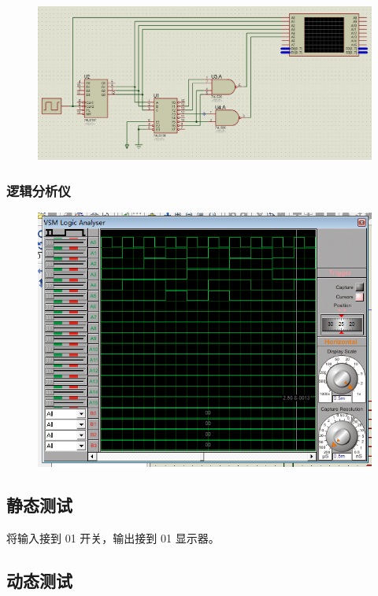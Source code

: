 \documentclass{article}
\begin{document}
\begin{figure}[!hbp]
  \centering
  \includegraphics[scale=0.3]{3/1.png}
\end{figure}

\subsubsection{逻辑分析仪}

\begin{figure}[!hbp]
  \centering
  \includegraphics[scale=0.5]{3/2.png}
\end{figure}

\subsection{静态测试}

将输入接到 01 开关，输出接到 01 显示器。

\newpage

\subsection{动态测试}
\end{document}
